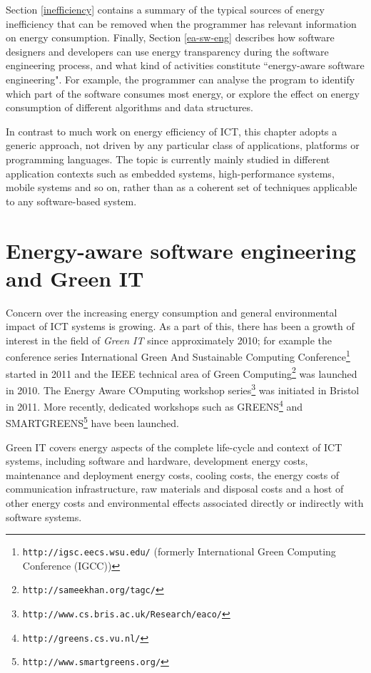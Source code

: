 \documentclass[oneside]{book}
\begin{document}
Section \ref{inefficiency} contains a summary of the typical sources of energy inefficiency that can be removed when the programmer has relevant information on energy consumption.   Finally, Section \ref{ea-sw-eng} describes how software designers and developers can use energy transparency during the software engineering process, and what kind of activities constitute ``energy-aware software engineering".  For example, the programmer can analyse the program to identify which part of the software consumes most energy, or explore the effect on
energy consumption of different algorithms and data structures.

In contrast to much work on energy efficiency of ICT, this chapter adopts a generic approach, not driven by any particular class of applications, platforms or programming languages. The topic is currently mainly studied in different application contexts such as embedded systems, high-performance systems, mobile systems and so on, rather than as a coherent set of techniques applicable to any software-based system.

\nopagebreak
\section{Energy-aware software engineering and Green IT}
\label{greenit}
Concern over the increasing energy consumption and general environmental impact of ICT systems is growing.  As a part of this,
there has been a growth of interest in the field of \emph{Green IT}  \cite{KrauseCraigWood2010,DBLP:journals/stt/NaumannKD13,DBLP:journals/infsof/CapraFS12,DBLP:journals/stt/NaumannKD13,Mahmoud_Ahmad_2013} since approximately 2010; for example the conference series International Green And Sustainable Computing Conference\footnote{\texttt{http://igsc.eecs.wsu.edu/} (formerly International Green Computing Conference (IGCC))} started in 2011 and the IEEE technical area of Green Computing\footnote{\texttt{http://sameekhan.org/tagc/}} was launched in 2010.  The Energy Aware COmputing workshop series\footnote{\texttt{http://www.cs.bris.ac.uk/Research/eaco/}} was initiated in Bristol in 2011.
More recently, dedicated workshops such as GREENS\footnote{\texttt{http://greens.cs.vu.nl/}} and SMARTGREENS\footnote{\texttt{http://www.smartgreens.org/}} have been launched. 

Green IT covers energy aspects of the complete life-cycle and context of ICT systems, including software and hardware, development energy costs, maintenance and deployment energy costs, cooling costs, the energy costs of communication infrastructure, raw materials and disposal costs and a host of other energy costs and environmental effects associated directly or indirectly with software systems. 
\end{document}
